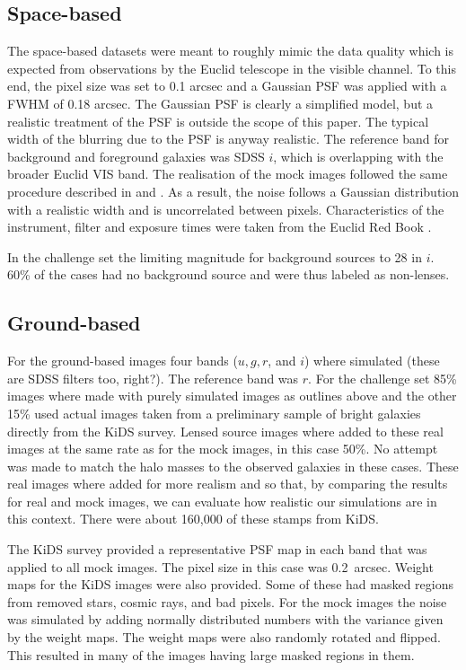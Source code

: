 \documentclass[useAMS,usenatbib]{mnras}
\begin{document}
\subsection{Space-based}
\label{sec:sim-space-based}

The space-based datasets were meant to roughly mimic the data quality which is expected from observations by the Euclid telescope in the visible channel. To this end, the pixel size was set to 0.1 arcsec and a Gaussian PSF was applied with a FWHM of 0.18 arcsec. The Gaussian PSF is clearly a simplified model, but a realistic treatment of the PSF is outside the scope of this paper. The typical width of the blurring due to the PSF is anyway realistic. The reference band for background and foreground galaxies was SDSS $i$, which is overlapping with the broader Euclid VIS band. The realisation of the mock images followed the same procedure described in \citet{2004PASP..116..750G} and \citet{2008A&A...482..403M}. As a result, the noise follows a Gaussian distribution with a realistic width and is uncorrelated between pixels. Characteristics of the instrument, filter and exposure times were taken from the Euclid Red Book \citep{2011arXiv1110.3193L}.
 
 In the challenge set the limiting magnitude for background sources to 28 in $i$.   60\% of the cases had no background source and were thus labeled as non-lenses.
 
\subsection{Ground-based}
\label{sec:sim-ground-based}

For the ground-based images four bands ($u,g,r$, and $i$) where simulated {\color{red} (these are SDSS filters too, right?)}.  The reference band was $r$.  For the challenge set 85\% images where made with purely simulated images as outlines above and the other 15\% used actual images taken from a preliminary sample of bright galaxies directly from the KiDS survey.  Lensed source images where added to these real images at the same rate as for the mock images,  in this case 50\%.  No attempt was made to match the halo masses to the observed galaxies in these cases.  These real images where added for more realism and so that, by comparing the results for real and mock images, we can evaluate how realistic our simulations are in this context.  There were about 160,000 of these stamps from KiDS.

The KiDS survey provided a representative PSF map in each band that was applied to all mock images.   The pixel size in this case was 0.2~arcsec. 
Weight maps for the KiDS images were also provided.  Some of these had masked regions from removed stars, cosmic rays, and bad pixels.  For the mock images the noise was simulated by adding normally distributed numbers with the variance given by the weight maps.  The weight maps were also randomly rotated and flipped.  This resulted in many of the images having large masked regions in them.
\end{document}
